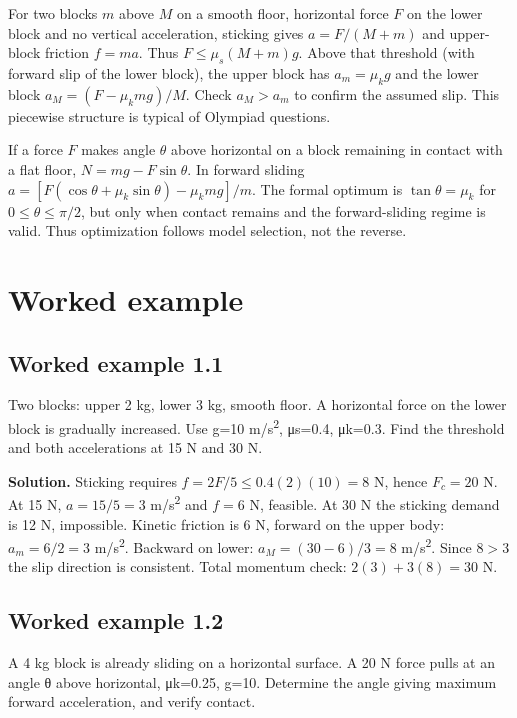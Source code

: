 \documentclass[11pt,a4paper,openany]{book}
\begin{document}
For two blocks $m$ above $M$ on a smooth floor, horizontal force $F$ on the lower block and no vertical acceleration, sticking gives $a=F/(M+m)$ and upper-block friction $f=ma$. Thus $F\le\mu_s(M+m)g$. Above that threshold (with forward slip of the lower block), the upper block has $a_m=\mu_k g$ and the lower block $a_M=(F-\mu_k mg)/M$. Check $a_M>a_m$ to confirm the assumed slip. This piecewise structure is typical of Olympiad questions.

If a force $F$ makes angle $\theta$ above horizontal on a block remaining in contact with a flat floor, $N=mg-F\sin\theta$. In forward sliding $a=[F(\cos\theta+\mu_k\sin\theta)-\mu_kmg]/m$. The formal optimum is $\tan\theta=\mu_k$ for $0\le\theta\le\pi/2$, but only when contact remains and the forward-sliding regime is valid. Thus optimization follows model selection, not the reverse.
\begin{center}
\end{center}
\section{Worked example}
\subsection*{Worked example 1.1}
Two blocks: upper 2 kg, lower 3 kg, smooth floor. A horizontal force on the lower block is gradually increased. Use g=10 m/s\textsuperscript{2}, μs=0.4, μk=0.3. Find the threshold and both accelerations at 15 N and 30 N.

\textbf{Solution.} Sticking requires $f=2F/5\le0.4(2)(10)=8$ N, hence $F_c=20$ N. At 15 N, $a=15/5=3$ m/s\textsuperscript{2} and $f=6$ N, feasible. At 30 N the sticking demand is 12 N, impossible. Kinetic friction is 6 N, forward on the upper body: $a_m=6/2=3$ m/s\textsuperscript{2}. Backward on lower: $a_M=(30-6)/3=8$ m/s\textsuperscript{2}. Since $8>3$ the slip direction is consistent. Total momentum check: $2(3)+3(8)=30$ N.
\subsection*{Worked example 1.2}
A 4 kg block is already sliding on a horizontal surface. A 20 N force pulls at an angle θ above horizontal, μk=0.25, g=10. Determine the angle giving maximum forward acceleration, and verify contact.
\end{document}
